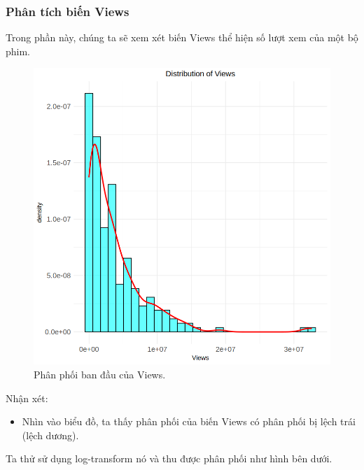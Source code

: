 \subsubsection{Phân tích biến Views}

Trong phần này, chúng ta sẽ xem xét biến Views thể hiện số lượt xem của một bộ phim.

\begin{figure}[H]
    \centering
    \includegraphics[width=0.75\columnwidth]{csm_figures/views_original_distribution.png}
    \caption{Phân phối ban đầu của Views.}
    \label{fig:views_original_distribution}
\end{figure}

Nhận xét:
\begin{itemize}
    \item Nhìn vào biểu đồ, ta thấy phân phối của biến Views có phân phối bị lệch trái (lệch dương).
\end{itemize}

Ta thử sử dụng log-transform nó và thu được phân phối như hình bên dưới.


